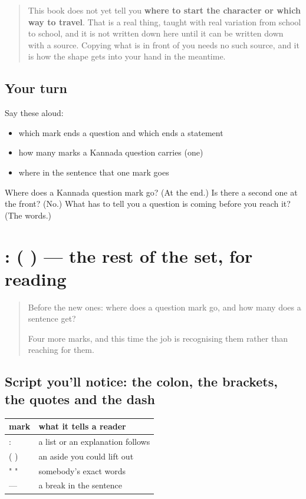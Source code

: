 \begin{quote}
This book does not yet tell you \textbf{where to start the character or which way to travel}. That is a real thing, taught with real variation from school to school, and it is not written down here until it can be written down with a source. Copying what is in front of you needs no such source, and it is how the shape gets into your hand in the meantime.
\end{quote}

\subsection*{Your turn}
Say these aloud:

\begin{itemize}
\raggedright
  \item which mark ends a question and which ends a statement
  \item how many marks a Kannada question carries (one)
  \item where in the sentence that one mark goes
\end{itemize}

\begin{tcolorbox}[breakable,colback=teal!4,colframe=teal!35!black,title={Before you move on}]
Where does a Kannada question mark go? (At the end.) Is there a second one at the front? (No.) What has to tell you a question is coming before you reach it? (The words.)
\end{tcolorbox}
\section[: ( ) (colon, brackets, quotes, dash)]{: ( ) — the rest of the set, for reading}

\label{lesson:KA-S154-other-marks}



\begin{quote}
Before the new ones: where does a question mark go, and how many does a sentence get?

Four more marks, and this time the job is recognising them rather than reaching for them.
\end{quote}

\subsection*{Script you'll notice: the colon, the brackets, the quotes and the dash}
\noindent
\begin{tabularx}{\linewidth}{@{}>{\raggedright\arraybackslash}X>{\raggedright\arraybackslash}X@{}}
\toprule
\textbf{mark} & \textbf{what it tells a reader} \\
\midrule
: & a list or an explanation follows \\
( ) & an aside you could lift out \\
" " & somebody's exact words \\
— & a break in the sentence \\
\bottomrule
\end{tabularx}

